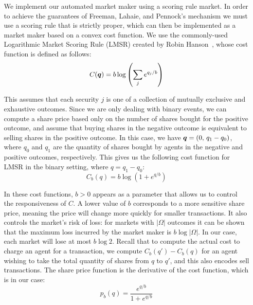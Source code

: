 We implement our automated market maker using a scoring rule market.  In order
to achieve the guarantees of Freeman, Lahaie, and Pennock's mechanism we must
use a scoring rule that is strictly proper, which can then be implemented as a
market maker based on a convex cost function. We use the commonly-used
Logarithmic Market Scoring Rule (LMSR) created by Robin
Hanson~\cite{Hanson2007}, whose cost function is defined as follows:
%
\begin{equation}
	\label{eq:LMSR}
	C(\bm{q}) = b \log \left( \sum_j e^{q_j/b} \right)
\end{equation}

This assumes that each security $j$ is one of a collection of mutually
exclusive and exhaustive outcomes. Since we are only dealing with binary
events, we can compute a share price based only on the number of shares bought
for the positive outcome, and assume that buying shares in the negative outcome
is equivalent to selling shares in the positive outcome. In this case, we have
$\bm{q}=( 0 , \, q_1 - q_0 )$, where $q_0$ and $q_1$ are the quantity of
shares bought by agents in the negative and positive outcomes, respectively.
This gives us the following cost function for LMSR in the binary setting, where
$q=q_1-q_0$:
%
\begin{equation}
	\label{eq:LMSRbinary}
	C_b (q) = b \log (1 + e^{q/b})
\end{equation}

In these cost functions, $b>0$ appears as a parameter that allows us to control
the responsiveness of $C$. A lower value of $b$ corresponds to a more sensitive
share price, meaning the price will change more quickly for smaller
transactions. It also controls the market's risk of loss: for markets with
$|\Omega|$ outcomes it can be shown that the maximum loss incurred by the
market maker is $b \log |\Omega|$. In our case, each market will lose at most
$b \log 2$. Recall that to compute the actual cost to charge an agent for a
transaction, we compute $C_b(q')-C_b(q)$ for an agent wishing to take the total
quantity of shares from $q$ to $q'$, and this also encodes sell transactions.
The share price function is the derivative of the cost function, which is in
our case:
%
\begin{equation}
	\label{eq:LMSRprice}
	p_b(q) = \frac{e^{q/b}}{1+e^{q/b}}
\end{equation}

